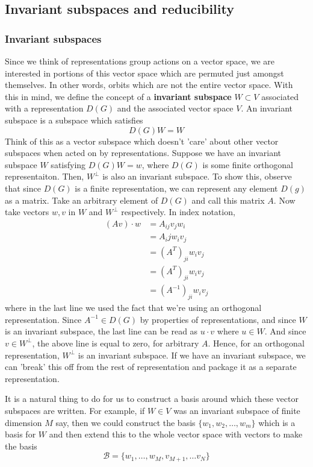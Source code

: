 \subsection{Invariant subspaces and reducibility}  
\subsubsection{ Invariant subspaces} 
Since we think of representations group actions on a vector space, we are interested in portions of this vector space which are permuted just amongst themselves. In other words, orbits which are not the entire vector space. With this in mind, we define the concept of a \textbf{invariant subspace} $W \subset V$ associated with a representation $D( G) $ and the associated vector space $V$. An invariant subspace is a subspace which satisfies \[ D(G) W  = W \] 
Think of this as a vector subspace which doesn't 'care' about other vector subspaces when acted on by representations. Suppose we have an invariant subspace $W$ satisfying $D(G)W = w$, where $D(G)$ is some finite orthogonal representaiton. Then, $W^ { \perp} $ is also an invariant subspace. To show this, observe that since $D(G)$ is a finite representation, we can represent any element $D(g)$ as a matrix. Take an arbitrary element of $D(G)$ and call this matrix $A$. Now take vectors $w, v $ in $W$ and $W^{\perp} $ respectively. In index notation, 
\begin{align*} 
(A v ) \cdot w & = A_{ij} v_j w_i \\
&= A_ij w_i v_j \\
&= (A^T)_{ji} w_i v_j \\ 
&= (A^T)_{ji} w_i v_j \\ 
&= (A^{-1})_{ji} w_i v_j 
\end{align*} 
where in the last line we used the fact that we're using an orthogonal representation. 
Since $A^{-1} \in D(G)$ by properties of representations, and since $W$ is an invariant subspace, the last line can be read as $u \cdot v$ where $u \in W$. And since $ v \in W^{\perp}$, the above line is equal to zero, for arbitrary $A$. Hence, for an orthogonal representation, $W^{\perp} $ is an invariant subspace. 
If we have an invariant subspace, we can 'break' this off from the rest of representation and package it as a separate representation. 

It is a natural thing to do for us to construct a basis around which these vector subspaces are written. For example, if $W \in V $ was an invariant subspace of finite dimension $M$ say, then we could construct the basis $\{ w_1, w_2, \dots, w_m \} $ which is a basis for $W$ and then extend this to the whole vector space with vectors to make the basis \[ \mathcal{B} = \{ w_1, \dots, w_M, v_{ M+1} , \dots v_{N} \} \]  





